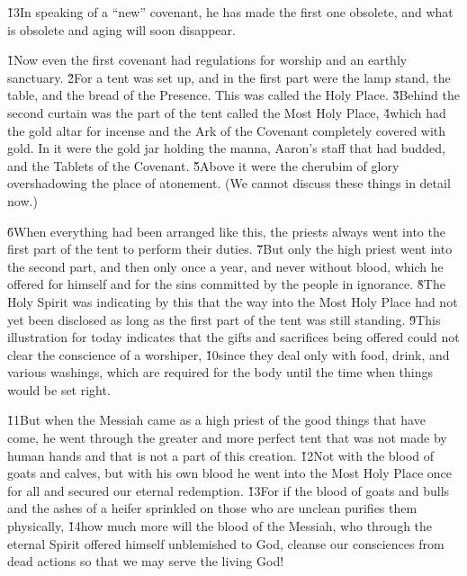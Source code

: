 \v{13}In speaking of a ``new'' covenant, he has made the first one obsolete, and what is obsolete and aging will soon disappear.

\v{1}Now even the first covenant had regulations for worship and an earthly sanctuary. \v{2}For a tent was set up, and in the first part were the lamp stand, the table, and the bread of the Presence. This was called the Holy Place. \v{3}Behind the second curtain was the part of the tent called the Most Holy Place, \v{4}which had the gold altar for incense and the Ark of the Covenant completely covered with gold. In it were the gold jar holding the manna, Aaron's staff that had budded, and the Tablets of the Covenant. \v{5}Above it were the cherubim of glory overshadowing the place of atonement. (We cannot discuss these things in detail now.)

\v{6}When everything had been arranged like this, the priests always went into the first part of the tent to perform their duties. \v{7}But only the high priest went into the second part, and then only once a year, and never without blood, which he offered for himself and for the sins committed by the people in ignorance. \v{8}The Holy Spirit was indicating by this that the way into the Most Holy Place had not yet been disclosed as long as the first part of the tent was still standing. \v{9}This illustration for today indicates that the gifts and sacrifices being offered could not clear the conscience of a worshiper, \v{10}since they deal only with food, drink, and various washings, which are required for the body until the time when things would be set right.

\v{11}But when the Messiah came as a high priest of the good things that have come, he went through the greater and more perfect tent that was not made by human hands and that is not a part of this creation. \v{12}Not with the blood of goats and calves, but with his own blood he went into the Most Holy Place once for all and secured our eternal redemption. \v{13}For if the blood of goats and bulls and the ashes of a heifer sprinkled on those who are unclean purifies them physically, \v{14}how much more will the blood of the Messiah, who through the eternal Spirit offered himself unblemished to God, cleanse our consciences from dead actions so that we may serve the living God!

